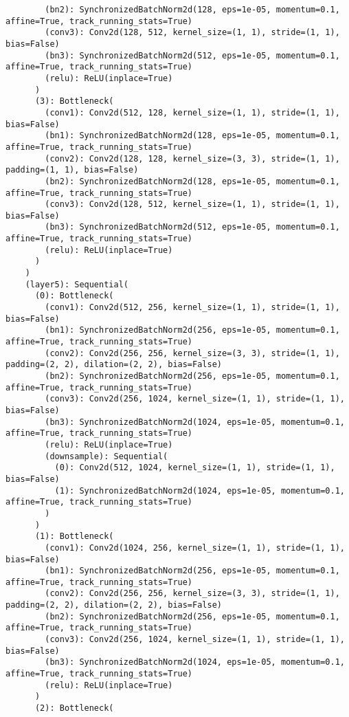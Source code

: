 \begin{verbatim}
        (bn2): SynchronizedBatchNorm2d(128, eps=1e-05, momentum=0.1, affine=True, track_running_stats=True)
        (conv3): Conv2d(128, 512, kernel_size=(1, 1), stride=(1, 1), bias=False)
        (bn3): SynchronizedBatchNorm2d(512, eps=1e-05, momentum=0.1, affine=True, track_running_stats=True)
        (relu): ReLU(inplace=True)
      )
      (3): Bottleneck(
        (conv1): Conv2d(512, 128, kernel_size=(1, 1), stride=(1, 1), bias=False)
        (bn1): SynchronizedBatchNorm2d(128, eps=1e-05, momentum=0.1, affine=True, track_running_stats=True)
        (conv2): Conv2d(128, 128, kernel_size=(3, 3), stride=(1, 1), padding=(1, 1), bias=False)
        (bn2): SynchronizedBatchNorm2d(128, eps=1e-05, momentum=0.1, affine=True, track_running_stats=True)
        (conv3): Conv2d(128, 512, kernel_size=(1, 1), stride=(1, 1), bias=False)
        (bn3): SynchronizedBatchNorm2d(512, eps=1e-05, momentum=0.1, affine=True, track_running_stats=True)
        (relu): ReLU(inplace=True)
      )
    )
    (layer5): Sequential(
      (0): Bottleneck(
        (conv1): Conv2d(512, 256, kernel_size=(1, 1), stride=(1, 1), bias=False)
        (bn1): SynchronizedBatchNorm2d(256, eps=1e-05, momentum=0.1, affine=True, track_running_stats=True)
        (conv2): Conv2d(256, 256, kernel_size=(3, 3), stride=(1, 1), padding=(2, 2), dilation=(2, 2), bias=False)
        (bn2): SynchronizedBatchNorm2d(256, eps=1e-05, momentum=0.1, affine=True, track_running_stats=True)
        (conv3): Conv2d(256, 1024, kernel_size=(1, 1), stride=(1, 1), bias=False)
        (bn3): SynchronizedBatchNorm2d(1024, eps=1e-05, momentum=0.1, affine=True, track_running_stats=True)
        (relu): ReLU(inplace=True)
        (downsample): Sequential(
          (0): Conv2d(512, 1024, kernel_size=(1, 1), stride=(1, 1), bias=False)
          (1): SynchronizedBatchNorm2d(1024, eps=1e-05, momentum=0.1, affine=True, track_running_stats=True)
        )
      )
      (1): Bottleneck(
        (conv1): Conv2d(1024, 256, kernel_size=(1, 1), stride=(1, 1), bias=False)
        (bn1): SynchronizedBatchNorm2d(256, eps=1e-05, momentum=0.1, affine=True, track_running_stats=True)
        (conv2): Conv2d(256, 256, kernel_size=(3, 3), stride=(1, 1), padding=(2, 2), dilation=(2, 2), bias=False)
        (bn2): SynchronizedBatchNorm2d(256, eps=1e-05, momentum=0.1, affine=True, track_running_stats=True)
        (conv3): Conv2d(256, 1024, kernel_size=(1, 1), stride=(1, 1), bias=False)
        (bn3): SynchronizedBatchNorm2d(1024, eps=1e-05, momentum=0.1, affine=True, track_running_stats=True)
        (relu): ReLU(inplace=True)
      )
      (2): Bottleneck(

\end{verbatim}
